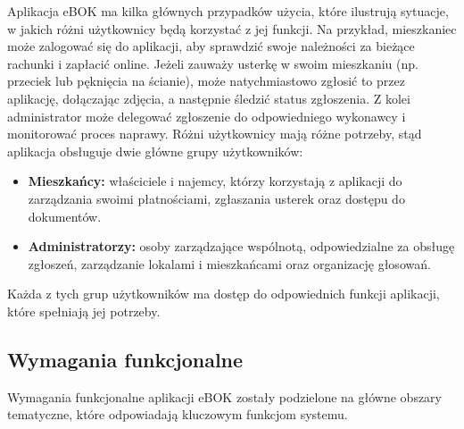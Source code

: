 Aplikacja eBOK ma kilka głównych przypadków użycia, które ilustrują sytuacje, w jakich różni użytkownicy będą korzystać z jej funkcji. Na przykład, mieszkaniec może zalogować się do aplikacji, aby sprawdzić swoje należności za bieżące rachunki i zapłacić online. Jeżeli zauważy usterkę w swoim mieszkaniu (np. przeciek lub pęknięcia na ścianie), może natychmiastowo zgłosić to przez aplikację, dołączając zdjęcia, a następnie śledzić status zgłoszenia. Z kolei administrator może delegować zgłoszenie do odpowiedniego wykonawcy i monitorować proces naprawy.
Różni użytkownicy mają różne potrzeby, stąd aplikacja obsługuje dwie główne grupy użytkowników:

\begin{itemize} 

	\item \textbf{Mieszkańcy:} właściciele i najemcy, którzy korzystają z aplikacji do zarządzania swoimi płatnościami, zgłaszania usterek oraz dostępu do dokumentów. 
	
	\item \textbf{Administratorzy:} osoby zarządzające wspólnotą, odpowiedzialne za obsługę zgłoszeń, zarządzanie lokalami i mieszkańcami oraz organizację głosowań.
	
\end{itemize}

Każda z tych grup użytkowników ma dostęp do odpowiednich funkcji aplikacji, które spełniają jej potrzeby.

\subsection{Wymagania funkcjonalne}

Wymagania funkcjonalne aplikacji eBOK zostały podzielone na główne obszary tematyczne, które odpowiadają kluczowym funkcjom systemu.

